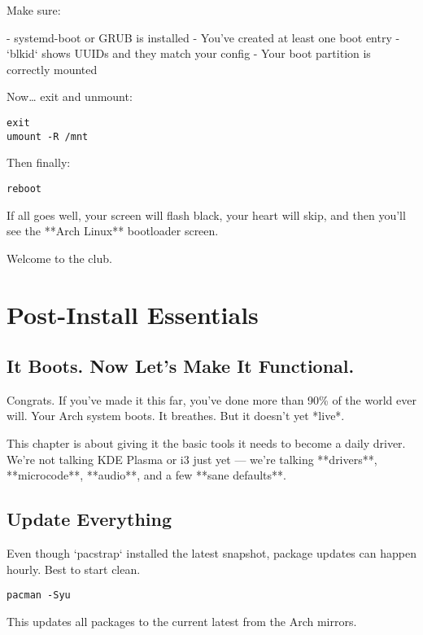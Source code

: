 \documentclass[12pt,openany]{book}
\begin{document}
Make sure:

- systemd-boot or GRUB is installed
- You’ve created at least one boot entry
- `blkid` shows UUIDs and they match your config
- Your boot partition is correctly mounted

Now… exit and unmount:

\begin{lstlisting}
exit
umount -R /mnt
\end{lstlisting}

Then finally:

\begin{lstlisting}
reboot
\end{lstlisting}

If all goes well, your screen will flash black, your heart will skip, and then you’ll see the **Arch Linux** bootloader screen.

Welcome to the club.

\clearpage


\chapter{Post-Install Essentials}

\section*{It Boots. Now Let’s Make It Functional.}

Congrats. If you’ve made it this far, you’ve done more than 90\% of the world ever will. Your Arch system boots. It breathes. But it doesn’t yet *live*.

This chapter is about giving it the basic tools it needs to become a daily driver. We’re not talking KDE Plasma or i3 just yet — we’re talking **drivers**, **microcode**, **audio**, and a few **sane defaults**.

\section{Update Everything}

Even though `pacstrap` installed the latest snapshot, package updates can happen hourly. Best to start clean.

\begin{lstlisting}
pacman -Syu
\end{lstlisting}

This updates all packages to the current latest from the Arch mirrors.
\end{document}
